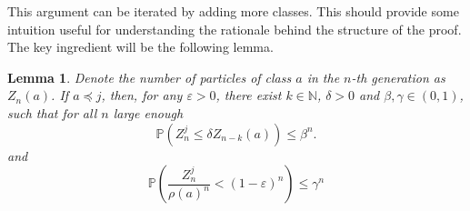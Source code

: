\documentclass[12pt]{article}
\numberwithin{equation}{section}
\newtheorem{lemma}[theorem]{Lemma}
\begin{document}
This argument can be iterated by adding more classes. This should provide some intuition useful for understanding the rationale behind the structure of the proof. The key ingredient will be the following lemma.

\begin{lemma}\label{lemma3}
Denote the number of particles of class $a$ in the $n$-th generation as $Z_n(a)$. If $a \preceq j$, then, for any $\varepsilon > 0$, there exist $k \in \mathbb{N}$, $\delta >0$ and $\beta,\gamma \in (0,1)$, such that for all $n$ large enough 
     \begin{equation}\label{l3:1}
         \mathbb{P}\left(Z^j_n \leq \delta  Z_{n-k}(a)\right) \leq \beta^n.
     \end{equation}
       and
    \begin{equation}\label{l3:2}
        \mathbb{P}\left(\frac{Z_{n}^j} {\rho(a)^n}< (1-\varepsilon)^n\right) \leq \gamma^n
    \end{equation}
    
    
\end{lemma}
\end{document}
